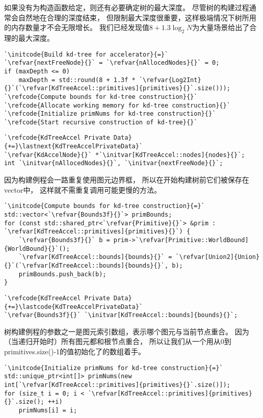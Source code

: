 如果没有为构造函数给定，则还有必要确定树的最大深度。
尽管树的构建过程通常会自然地在合理的深度结束，
但限制最大深度很重要，这样极端情况下树所用的内存数量才不会无限增长。
我们已经发现值$8+1.3\log_2N$为大量场景给出了合理的最大深度。

\begin{lstlisting}
`\initcode{Build kd-tree for accelerator}{=}`
`\refvar{nextFreeNode}{}` = `\refvar{nAllocedNodes}{}` = 0;
if (maxDepth <= 0)
    maxDepth = std::round(8 + 1.3f * `\refvar{Log2Int}{}`(`\refvar[KdTreeAccel::primitives]{primitives}{}`.size()));
`\refcode{Compute bounds for kd-tree construction}{}`
`\refcode{Allocate working memory for kd-tree construction}{}`
`\refcode{Initialize primNums for kd-tree construction}{}`
`\refcode{Start recursive construction of kd-tree}{}`
\end{lstlisting}

\begin{lstlisting}
`\refcode{KdTreeAccel Private Data}{+=}\lastnext{KdTreeAccelPrivateData}`
`\refvar{KdAccelNode}{}` *`\initvar[KdTreeAccel::nodes]{nodes}{}`;
int `\initvar{nAllocedNodes}{}`, `\initvar{nextFreeNode}{}`;
\end{lstlisting}

因为构建例程会一路重复使用图元边界框，
所以在开始构建树前它们被保存在{\ttfamily vector}中，
这样就不需重复调用可能更慢的方法。
\begin{lstlisting}
`\initcode{Compute bounds for kd-tree construction}{=}`
std::vector<`\refvar{Bounds3f}{}`> primBounds;
for (const std::shared_ptr<`\refvar{Primitive}{}`> &prim : `\refvar[KdTreeAccel::primitives]{primitives}{}`) {
    `\refvar{Bounds3f}{}` b = prim->`\refvar[Primitive::WorldBound]{WorldBound}{}`();
    `\refvar[KdTreeAccel::bounds]{bounds}{}` = `\refvar[Union2]{Union}{}`(`\refvar[KdTreeAccel::bounds]{bounds}{}`, b);
    primBounds.push_back(b);
}
\end{lstlisting}

\begin{lstlisting}
`\refcode{KdTreeAccel Private Data}{+=}\lastcode{KdTreeAccelPrivateData}`
`\refvar{Bounds3f}{}` `\initvar[KdTreeAccel::bounds]{bounds}{}`;
\end{lstlisting}

树构建例程的参数之一是图元索引数组，表示哪个图元与当前节点重合。
因为（当递归开始时）所有图元都和根节点重合，
所以让我们从一个用从0到{\ttfamily primitives.size()-1}的值初始化了的数组着手。
\begin{lstlisting}
`\initcode{Initialize primNums for kd-tree construction}{=}`
std::unique_ptr<int[]> primNums(new int[`\refvar[KdTreeAccel::primitives]{primitives}{}`.size()]);
for (size_t i = 0; i < `\refvar[KdTreeAccel::primitives]{primitives}{}`.size(); ++i)
    primNums[i] = i;
\end{lstlisting}

